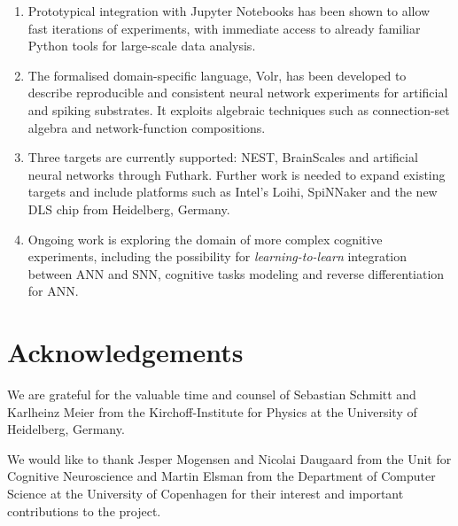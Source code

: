 \documentclass[a0,portrait]{a0poster}
\begin{document}
\begin{multicols}{2}
\begin{enumerate}
\item Prototypical integration with Jupyter Notebooks has been shown to allow fast iterations of experiments, with immediate access to already familiar Python tools for large-scale data analysis.
\item The formalised domain-specific language, Volr, has been developed to describe reproducible and consistent neural network experiments for artificial and spiking substrates.
It exploits algebraic techniques such as connection-set algebra \cite{Djurfeldt2012} and network-function compositions.
\item Three targets are currently supported: NEST, BrainScales and artificial neural networks through Futhark. Further work is needed to expand existing targets and include platforms such as Intel's Loihi, SpiNNaker and the new DLS chip from Heidelberg, Germany.
\item Ongoing work is exploring the domain of more complex cognitive experiments, including 
the possibility for \textit{learning-to-learn} integration between ANN and SNN, cognitive 
tasks modeling and reverse differentiation for ANN.
\end{enumerate}

\color{DarkSlateGray} %


\nocite{*} %


\section*{Acknowledgements}
We are grateful for the valuable time and counsel of Sebastian Schmitt and Karlheinz Meier 
from the Kirchoff-Institute for Physics at the University of Heidelberg, Germany.

We would like to thank Jesper Mogensen and Nicolai Daugaard from the Unit for Cognitive 
Neuroscience and Martin Elsman from the Department of Computer Science at the University of 
Copenhagen for their interest and important contributions to the project.


\end{multicols}
\end{document}
